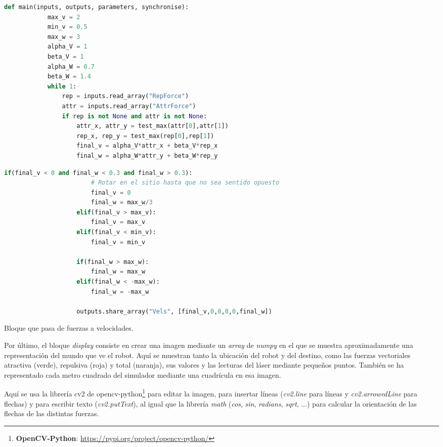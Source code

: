 \begin{code}[H]
    \begin{lstlisting}[language=python]
        def main(inputs, outputs, parameters, synchronise):
            max_v = 2
            min_v = 0.5
            max_w = 3
            alpha_V = 1
            beta_V = 1
            alpha_W = 0.7
            beta_W = 1.4
            while 1:
                rep = inputs.read_array("RepForce")
                attr = inputs.read_array("AttrForce")
                if rep is not None and attr is not None:
                    attr_x, attr_y = test_max(attr[0],attr[1])
                    rep_x, rep_y = test_max(rep[0],rep[1])
                    final_v = alpha_V*attr_x + beta_V*rep_x
                    final_w = alpha_W*attr_y + beta_W*rep_y
    \end{lstlisting}
\end{code}
\begin{code}[H]
    \begin{lstlisting}[language=python]
                    if(final_v < 0 and final_w < 0.3 and final_w > 0.3):
                        # Rotar en el sitio hasta que no sea sentido opuesto
                        final_v = 0
                        final_w = max_w/3
                    elif(final_v > max_v):
                        final_v = max_v
                    elif(final_v < min_v):
                        final_v = min_v

                    if(final_w > max_w):
                        final_w = max_w
                    elif(final_w < -max_w):
                        final_w = -max_w

                    outputs.share_array("Vels", [final_v,0,0,0,0,final_w])
    \end{lstlisting}
    \caption[Bloque forces to vels]{Bloque que pasa de fuerzas a velocidades.}
    \label{cod:FSM_forcestovels}
\end{code}

Por último, el bloque \textit{display} consiste en crear una imagen mediante un \textit{array} de \textit{numpy} en el que se muestra aproximadamente una representación del
mundo que ve el robot. Aquí se muestran tanto la ubicación del robot y del destino, como las fuerzas vectoriales atractiva (verde), repulsiva (roja) y total (naranja), sus valores y las lecturas
del láser mediante pequeños puntos. También se ha representado cada metro cuadrado del simulador mediante una cuadrícula en esa imagen.

Aquí se usa la librería cv2 de opencv-python\footnote{\textbf{OpenCV-Python}: \url{https://pypi.org/project/opencv-python/}} para editar la imagen, para insertar
líneas (\textit{cv2.line} para líneas y \textit{cv2.arrowedLine} para flechas) y para escribir texto (\textit{cv2.putText}), al igual que la librería \textit{math}
(\textit{cos}, \textit{sin}, \textit{radians}, \textit{sqrt}, ...) para calcular la orientación de las flechas de las distintas fuerzas.

